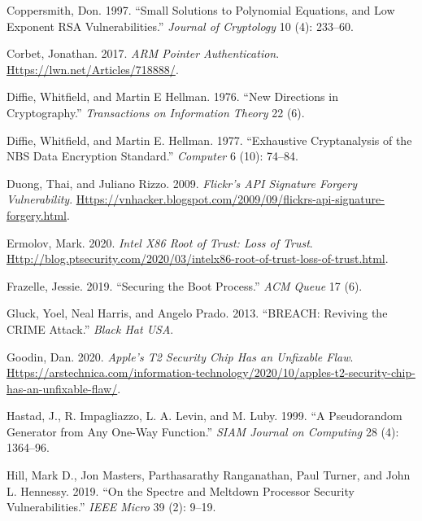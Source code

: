 \documentclass[
  letterpaper,
]{scrbook}
\newlength{\cslhangindent}
\newenvironment{CSLReferences}[2] %
 {\begin{list}{}{%
  \setlength{\itemindent}{0pt}
  \setlength{\leftmargin}{0pt}
  \setlength{\parsep}{0pt}
  \ifodd #1
   \setlength{\leftmargin}{\cslhangindent}
   \setlength{\itemindent}{-1\cslhangindent}
  \fi
  \setlength{\itemsep}{#2\baselineskip}}}
 {\end{list}}
\theoremstyle{definition}
\theoremstyle{plain}
\theoremstyle{plain}
\theoremstyle{remark}
\begin{document}
\begin{CSLReferences}{1}{1}
Coppersmith, Don. 1997. {``Small Solutions to Polynomial Equations, and
Low Exponent {RSA} Vulnerabilities.''} \emph{Journal of Cryptology} 10
(4): 233--60.

Corbet, Jonathan. 2017. \emph{{ARM} Pointer Authentication}.
\href{https://lwn.net/Articles/718888/}{Https://lwn.net/Articles/718888/}.

Diffie, Whitfield, and Martin E Hellman. 1976. {``New Directions in
Cryptography.''} \emph{Transactions on Information Theory} 22 (6).

Diffie, Whitfield, and Martin E. Hellman. 1977. {``Exhaustive
Cryptanalysis of the {NBS} Data Encryption Standard.''} \emph{Computer}
6 (10): 74--84.

Duong, Thai, and Juliano Rizzo. 2009. \emph{{Flickr's} {API} Signature
Forgery Vulnerability}.
\href{https://vnhacker.blogspot.com/2009/09/flickrs-api-signature-forgery.html}{Https://vnhacker.blogspot.com/2009/09/flickrs-api-signature-forgery.html}.

Ermolov, Mark. 2020. \emph{Intel X86 Root of Trust: Loss of Trust}.
\href{http://blog.ptsecurity.com/2020/03/intelx86-root-of-trust-loss-of-trust.html}{Http://blog.ptsecurity.com/2020/03/intelx86-root-of-trust-loss-of-trust.html}.

Frazelle, Jessie. 2019. {``Securing the Boot Process.''} \emph{ACM
Queue} 17 (6).

Gluck, Yoel, Neal Harris, and Angelo Prado. 2013. {``{BREACH}: Reviving
the {CRIME} Attack.''} \emph{Black Hat USA}.

Goodin, Dan. 2020. \emph{{Apple's} {T2} Security Chip Has an Unfixable
Flaw}.
\href{https://arstechnica.com/information-technology/2020/10/apples-t2-security-chip-has-an-unfixable-flaw/}{Https://arstechnica.com/information-technology/2020/10/apples-t2-security-chip-has-an-unfixable-flaw/}.

Hastad, J., R. Impagliazzo, L. A. Levin, and M. Luby. 1999. {``A
Pseudorandom Generator from Any One-Way Function.''} \emph{SIAM Journal
on Computing} 28 (4): 1364--96.

Hill, Mark D., Jon Masters, Parthasarathy Ranganathan, Paul Turner, and
John L. Hennessy. 2019. {``On the {Spectre} and {Meltdown} Processor
Security Vulnerabilities.''} \emph{IEEE Micro} 39 (2): 9--19.


\end{CSLReferences}
\end{document}
